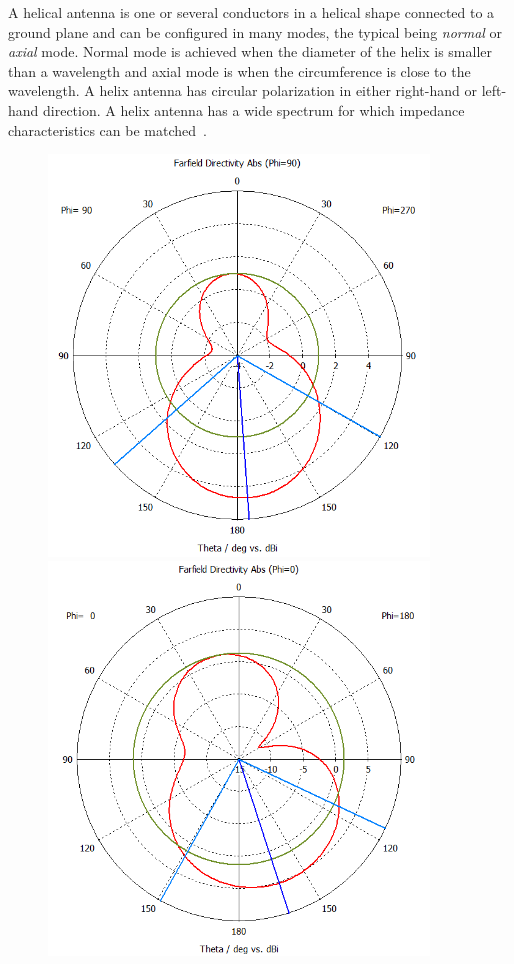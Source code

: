 A helical antenna is one or several conductors in a helical shape connected to a ground plane and can be configured in many modes, the typical being \textit{normal} or \textit{axial} mode. Normal mode is achieved when the diameter of the helix is smaller than a wavelength and axial mode is when the circumference is close to the wavelength. A helix antenna has circular polarization in either right-hand or left-hand direction. A helix antenna has a wide spectrum for which impedance characteristics can be matched~\cite[p. 12.2]{ant_eng_hk}.
\begin{figure}[H]
    \begin{minipage}{0.45\textwidth}
        \centering
        \includegraphics[width=0.9\textwidth]{figures/farfield (f=2.4) helical.png} %
    \end{minipage}\hfill
    \begin{minipage}{0.45\textwidth}
        \centering
        \includegraphics[width=0.9\textwidth]{figures/farfield (f=2.4) helical_1.png} %

\end{minipage}
\end{figure}

